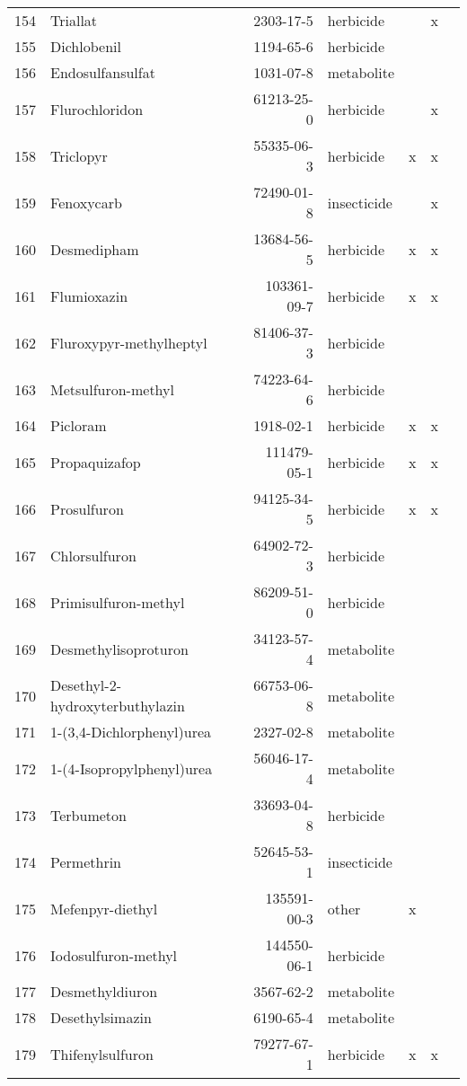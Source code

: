 \begin{longtable}{lp{3cm}rlp{0.5cm}p{0.5cm}p{1cm}}
  154 & Triallat & 2303-17-5 & herbicide &  & x &  \\ 
  155 & Dichlobenil & 1194-65-6 & herbicide &  &  &  \\ 
  156 & Endosulfansulfat & 1031-07-8 & metabolite &  &  &  \\ 
  157 & Flurochloridon & 61213-25-0 & herbicide &  & x &  \\ 
  158 & Triclopyr & 55335-06-3 & herbicide & x & x &  \\ 
  159 & Fenoxycarb & 72490-01-8 & insecticide &  & x &  \\ 
  160 & Desmedipham & 13684-56-5 & herbicide & x & x &  \\ 
  161 & Flumioxazin & 103361-09-7 & herbicide & x & x &  \\ 
  162 & Fluroxypyr-methylheptyl & 81406-37-3 & herbicide &  &  &  \\ 
  163 & Metsulfuron-methyl & 74223-64-6 & herbicide &  &  &  \\ 
  164 & Picloram & 1918-02-1 & herbicide & x & x &  \\ 
  165 & Propaquizafop & 111479-05-1 & herbicide & x & x &  \\ 
  166 & Prosulfuron & 94125-34-5 & herbicide & x & x &  \\ 
  167 & Chlorsulfuron & 64902-72-3 & herbicide &  &  &  \\ 
  168 & Primisulfuron-methyl & 86209-51-0 & herbicide &  &  &  \\ 
  169 & Desmethylisoproturon & 34123-57-4 & metabolite &  &  &  \\ 
  170 & Desethyl-2-hydroxyterbuthylazin & 66753-06-8 & metabolite &  &  &  \\ 
  171 & 1-(3,4-Dichlorphenyl)urea & 2327-02-8 & metabolite &  &  &  \\ 
  172 & 1-(4-Isopropylphenyl)urea & 56046-17-4 & metabolite &  &  &  \\ 
  173 & Terbumeton & 33693-04-8 & herbicide &  &  &  \\ 
  174 & Permethrin & 52645-53-1 & insecticide &  &  &  \\ 
  175 & Mefenpyr-diethyl & 135591-00-3 & other & x &  &  \\ 
  176 & Iodosulfuron-methyl & 144550-06-1 & herbicide &  &  &  \\ 
  177 & Desmethyldiuron & 3567-62-2 & metabolite &  &  &  \\ 
  178 & Desethylsimazin & 6190-65-4 & metabolite &  &  &  \\ 
  179 & Thifenylsulfuron & 79277-67-1 & herbicide & x & x &  \\ 

\end{longtable}
